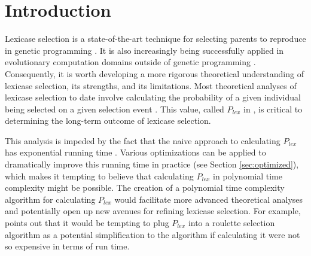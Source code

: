 \documentclass[sigconf]{acmart}
\begin{document}
\maketitle

\section{Introduction}



Lexicase selection is a state-of-the-art technique for selecting parents to reproduce in genetic programming \citep{spector_assessment_2012, helmuth_general_2015, helmuth_benchmarking_2020}. It is also increasingly being successfully applied in evolutionary computation domains outside of genetic programming \citep{metevier_lexicase_2019, lalejini_artificial_2022}. Consequently, it is worth developing a more rigorous theoretical understanding of lexicase selection, its strengths, and its limitations. Most theoretical analyses of lexicase selection to date involve calculating the probability of a given individual being selected on a given selection event \citep{la_cava_probabilistic_2018, dolson_ecological_2018}. This value, called $P_{lex}$ in \citep{la_cava_probabilistic_2018}, is critical to determining the long-term outcome of lexicase selection. 

This analysis is impeded by the fact that the naive approach to calculating $P_{lex}$ has exponential running time \citep{la_cava_probabilistic_2018}. Various optimizations can be applied to dramatically improve this running time in practice (see Section \ref{sec:optimized}), which makes it tempting to believe that calculating $P_{lex}$ in polynomial time complexity might be possible. The creation of a polynomial time complexity algorithm for calculating $P_{lex}$ would facilitate more advanced theoretical analyses and potentially open up new avenues for refining lexicase selection. For example, \citep{la_cava_probabilistic_2018} points out that it would be tempting to plug $P_{lex}$ into a roulette selection algorithm as a potential simplification to the algorithm if calculating it were not so expensive in terms of run time.
\end{document}
